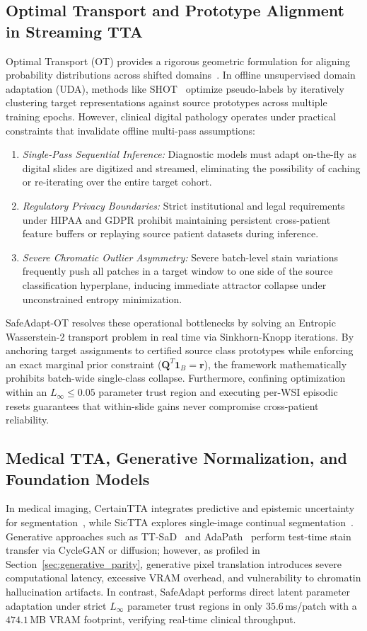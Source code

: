 \documentclass[journal]{IEEEtran}
\begin{document}
\subsection{Optimal Transport and Prototype Alignment in Streaming TTA}
Optimal Transport (OT) provides a rigorous geometric formulation for aligning probability distributions across shifted domains~\cite{courty2017optimal}. In offline unsupervised domain adaptation (UDA), methods like SHOT~\cite{liang2020shot} optimize pseudo-labels by iteratively clustering target representations against source prototypes across multiple training epochs. However, clinical digital pathology operates under practical constraints that invalidate offline multi-pass assumptions:
\begin{enumerate}
\item \textit{Single-Pass Sequential Inference:} Diagnostic models must adapt on-the-fly as digital slides are digitized and streamed, eliminating the possibility of caching or re-iterating over the entire target cohort.
\item \textit{Regulatory Privacy Boundaries:} Strict institutional and legal requirements under HIPAA and GDPR prohibit maintaining persistent cross-patient feature buffers or replaying source patient datasets during inference.
\item \textit{Severe Chromatic Outlier Asymmetry:} Severe batch-level stain variations frequently push all patches in a target window to one side of the source classification hyperplane, inducing immediate attractor collapse under unconstrained entropy minimization.
\end{enumerate}
SafeAdapt-OT resolves these operational bottlenecks by solving an Entropic Wasserstein-2 transport problem in real time via Sinkhorn-Knopp iterations. By anchoring target assignments to certified source class prototypes while enforcing an exact marginal prior constraint ($\mathbf{Q}^T \mathbf{1}_B = \mathbf{r}$), the framework mathematically prohibits batch-wide single-class collapse. Furthermore, confining optimization within an $L_\infty \le 0.05$ parameter trust region and executing per-WSI episodic resets guarantees that within-slide gains never compromise cross-patient reliability.

\subsection{Medical TTA, Generative Normalization, and Foundation Models}
In medical imaging, CertainTTA integrates predictive and epistemic uncertainty for segmentation~\cite{certaintta2025}, while SicTTA explores single-image continual segmentation~\cite{sictta2026}. Generative approaches such as TT-SaD~\cite{ttsad2024} and AdaPath~\cite{chen2023adapath} perform test-time stain transfer via CycleGAN or diffusion; however, as profiled in Section~\ref{sec:generative_parity}, generative pixel translation introduces severe computational latency, excessive VRAM overhead, and vulnerability to chromatin hallucination artifacts. In contrast, SafeAdapt performs direct latent parameter adaptation under strict $L_\infty$ parameter trust regions in only $35.6$\,ms/patch with a $474.1$\,MB VRAM footprint, verifying real-time clinical throughput.
\end{document}
